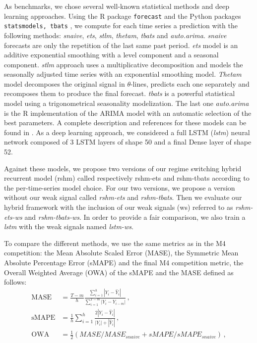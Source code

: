 \documentclass{article} %
\begin{document}
As benchmarks, we chose several well-known statistical methods and deep learning approaches. Using the R package \texttt{forecast} and the Python packages \texttt{statsmodels, tbats} , we compute for each time series a prediction with the following methods: \textit{snaive}, \textit{ets}, \textit{stlm}, \textit{thetam}, \textit{tbats} and \textit{auto.arima}. \textit{snaive} forecasts are only the repetition of the last same past period. \textit{ets} model is an additive exponential smoothing with a level component and a seasonal component. \textit{stlm} approach uses a multiplicative decomposition and models the seasonally adjusted time series with an exponential smoothing model. \textit{Thetam} model decomposes the original signal in $\theta$-lines, predicts each one separately and recomposes them to produce the final forecast. \textit{tbats} is a powerful statistical model using a trigonometrical seasonality modelization. The last one \textit{auto.arima} is the R implementation of the ARIMA model with an automatic selection of the best parameters. A complete description and references for these models can be found in \citep{hyndman2020package}. As a deep learning approach, we considered a full LSTM (\textit{lstm}) neural network composed of 3 LSTM layers of shape 50 and a final Dense layer of shape 52.

Against these models, we propose two versions of our regime switching hybrid recurrent model (rshm) called respectively rshm-ets and rshm-tbats according to the per-time-series model choice.
For our two versions, we propose a version without our weak signal called \textit{rshm-ets} and \textit{rshm-tbats}. Then we evaluate our hybrid framework with the inclusion of our weak signals (ws) referred to as \textit{rshm-ets-ws} and \textit{rshm-tbats-ws}. In order to provide a fair comparison, we also train a \textit{lstm} with the weak signals named \textit{lstm-ws}.

To compare the different methods, we use the same metrics as in the M4 competition: the Mean Absolute Scaled Error (MASE), the Symmetric Mean Absolute Percentage Error (sMAPE) and the final M4 competition metric, the Overall Weighted Average (OWA) of the sMAPE and the MASE defined as follows:
\begin{align*}
\mathrm{MASE} &= \frac{T-m}{h}\frac{\sum_{i=1}^h |Y_i - \hat{Y}_i| }{\sum_{i=1}^{T-m} |Y_i - Y_{i-m}|}\,,\\
\mathrm{sMAPE} &= \frac{1}{h} \sum_{i=1}^h \frac{2|Y_i - \hat{Y}_i|}{|Y_i| + |\hat{Y}_i|}\,,\\
\mathrm{OWA} &= \frac{1}{2}\left(MASE/MASE_{snaive} + sMAPE/sMAPE_{snaive}\right)\,,
\end{align*}
\end{document}
